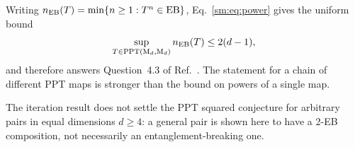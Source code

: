 \documentclass[aps,prl,reprint,superscriptaddress,nofootinbib]{revtex4-2}
\newcommand{\M}{\mathrm{M}}
\newcommand{\PPT}{\operatorname{PPT}}
\newcommand{\EB}{\operatorname{EB}}
\begin{document}
Writing
\(n_{\rm EB}(T)=\min\{n\geq1:T^n\in\EB\}\), Eq.~\eqref{sm:eq:power} gives
the uniform bound
\begin{equation}
 \sup_{T\in\PPT(\M_d,\M_d)} n_{\rm EB}(T)
 \leq2(d-1),
\label{sm:eq:uniformindex}
\end{equation}
and therefore answers Question~4.3 of Ref.~\cite{Park2026}.  The statement
for a chain of different PPT maps is stronger than the bound on powers of a
single map.

The iteration result does not settle the PPT squared conjecture for arbitrary
pairs in equal dimensions \(d\geq4\): a general pair is
shown here to have a 2-EB composition, not
necessarily an entanglement-breaking one.
\end{document}
